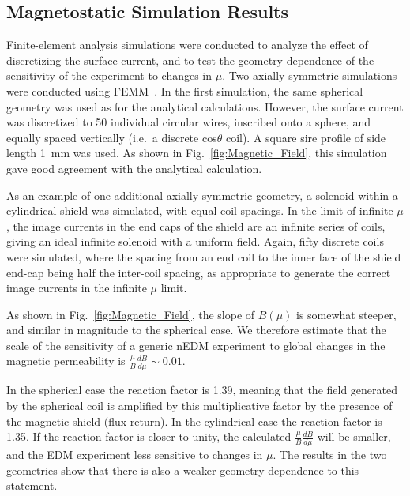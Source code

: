 \documentclass[review]{elsarticle}
\begin{document}
\subsection{Magnetostatic Simulation Results \label{sec:femm}}

Finite-element analysis simulations were conducted to analyze the
effect of discretizing the surface current, and to test the geometry
dependence of the sensitivity of the experiment to changes in $\mu$.
Two axially symmetric simulations were conducted using
FEMM~\cite{bib:femm}.  In the first simulation, the same spherical
geometry was used as for the analytical calculations.  However, the
surface current was discretized to 50 individual circular wires,
inscribed onto a sphere, and equally spaced vertically (i.e.~a
discrete cos$\theta$ coil).  A square sire profile of side length 1~mm
was used.  As shown in Fig.~\ref{fig:Magnetic_Field}, this simulation
gave good agreement with the analytical calculation.

As an example of one additional axially symmetric geometry, a solenoid
within a cylindrical shield was simulated, with equal coil spacings.
In the limit of infinite $\mu$, the image currents in the end caps of
the shield are an infinite series of coils, giving an ideal infinite
solenoid with a uniform field.  Again, fifty discrete coils were
simulated, where the spacing from an end coil to the inner face of the
shield end-cap being half the inter-coil spacing, as appropriate to
generate the correct image currents in the infinite $\mu$ limit. 

As shown in Fig.~\ref{fig:Magnetic_Field}, the slope of $B(\mu)$ is
somewhat steeper, and similar in magnitude to the spherical case.  We
therefore estimate that the scale of the sensitivity of a generic nEDM
experiment to global changes in the magnetic permeability is
$\frac{\mu}{B}\frac{dB}{d\mu}\sim 0.01$.

In the spherical case the reaction factor is 1.39, meaning that the
field generated by the spherical coil is amplified by this
multiplicative factor by the presence of the magnetic shield (flux
return).  In the cylindrical case the reaction factor is 1.35.  If the
reaction factor is closer to unity, the calculated
$\frac{\mu}{B}\frac{dB}{d\mu}$ will be smaller, and the EDM experiment
less sensitive to changes in $\mu$.  The results in the two geometries
show that there is also a weaker geometry dependence to this
statement.


\end{document}
